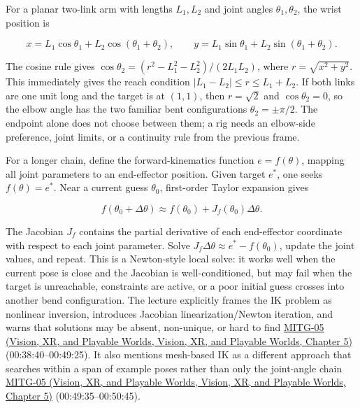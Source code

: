 For a planar two-link arm with lengths \(L_1,L_2\) and joint angles \(\theta_1,\theta_2\), the wrist position is

\[
x=L_1\cos\theta_1+L_2\cos(\theta_1+\theta_2),\qquad
y=L_1\sin\theta_1+L_2\sin(\theta_1+\theta_2).
\]

The cosine rule gives \(\cos\theta_2=(r^2-L_1^2-L_2^2)/(2L_1L_2)\), where \(r=\sqrt{x^2+y^2}\). This immediately gives the reach condition \(|L_1-L_2|\le r\le L_1+L_2\). If both links are one unit long and the target is at \((1,1)\), then \(r=\sqrt2\) and \(\cos\theta_2=0\), so the elbow angle has the two familiar bent configurations \(\theta_2=\pm\pi/2\). The endpoint alone does not choose between them; a rig needs an elbow-side preference, joint limits, or a continuity rule from the previous frame.

For a longer chain, define the forward-kinematics function \(e=f(\theta)\), mapping all joint parameters to an end-effector position. Given target \(e^*\), one seeks \(f(\theta)=e^*\). Near a current guess \(\theta_0\), first-order Taylor expansion gives

\[
f(\theta_0+\Delta\theta)\approx f(\theta_0)+J_f(\theta_0)\Delta\theta.
\]

The Jacobian \(J_f\) contains the partial derivative of each end-effector coordinate with respect to each joint parameter. Solve \(J_f\Delta\theta\approx e^*-f(\theta_0)\), update the joint values, and repeat. This is a Newton-style local solve: it works well when the current pose is close and the Jacobian is well-conditioned, but may fail when the target is unreachable, constraints are active, or a poor initial guess crosses into another bend configuration. The lecture explicitly frames the IK problem as nonlinear inversion, introduces Jacobian linearization/Newton iteration, and warns that solutions may be absent, non-unique, or hard to find \href{../07-Vision-XR-and-Playable-Worlds/main.pdf\#nameddest=04-visual-computing-ii-ch036-mitg-05---hierarchical-modeling}{MITG-05 (Vision, XR, and Playable Worlds, Vision, XR, and Playable Worlds, Chapter 5)} (00:38:40--00:49:25). It also mentions mesh-based IK as a different approach that searches within a span of example poses rather than only the joint-angle chain \href{../07-Vision-XR-and-Playable-Worlds/main.pdf\#nameddest=04-visual-computing-ii-ch036-mitg-05---hierarchical-modeling}{MITG-05 (Vision, XR, and Playable Worlds, Vision, XR, and Playable Worlds, Chapter 5)} (00:49:35--00:50:45).

